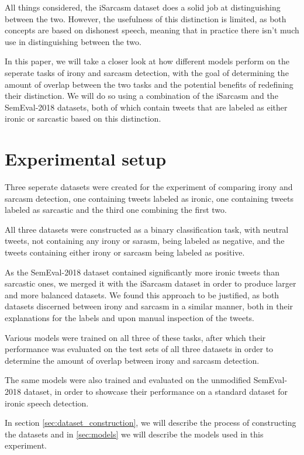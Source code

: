 \documentclass[10pt, a4paper]{article}
\begin{document}
All things considered, the iSarcasm \citep{iSarcasm} dataset
does a solid job at distinguishing between the two. However, the usefulness of this distinction is limited, as both concepts
are based on dishonest speech, meaning that in practice there isn't much use in distinguishing between the two.

In this paper, we will take a closer look at how different models perform on the seperate tasks of irony and sarcasm detection,
with the goal of determining the amount of overlap between the two tasks and the potential benefits of redefining their distinction.
We will do so using a combination of the iSarcasm \citep{iSarcasm} and the SemEval-2018 \citep{semeval-2018} 
datasets, both of which contain tweets that are labeled as either ironic or sarcastic based on this distinction.

\section{Experimental setup}

Three seperate datasets were created for the experiment of comparing irony and sarcasm detection, one containing tweets labeled
as ironic, one containing tweets labeled as sarcastic and the third one combining the first two.

All three datasets were constructed as a binary classification task, with neutral tweets, not containing any irony or sarasm,
being labeled as negative, and the tweets containing either irony or sarcasm being labeled as positive.

As the SemEval-2018 dataset contained significantly more
ironic tweets than sarcastic ones, we merged it with the iSarcasm dataset in order to produce larger and more balanced datasets.
We found this approach to be justified, as both datasets discerned between irony and sarcasm in a similar manner, both in
their explanations for the labels and upon manual inspection of the tweets. 

Various models were trained on all three of these tasks, after which their performance was evaluated on the test sets of all
three datasets in order to determine the amount of overlap between irony and sarcasm detection.

The same models were also trained and evaluated on the unmodified SemEval-2018 dataset, in order to showcase their performance
on a standard dataset for ironic speech detection.

In section \ref{sec:dataset_construction}, we will describe the process of constructing the datasets and in \ref{sec:models}
we will describe the models used in this experiment.
\end{document}
